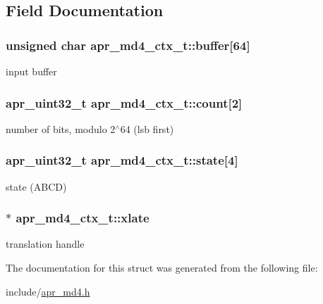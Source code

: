 \subsection{Field Documentation}
\hypertarget{structapr__md4__ctx__t_a60ce2de9e1c0b8888d81da03afdbfcdb}{
\subsubsection[{buffer}]{\setlength{\rightskip}{0pt plus 5cm}unsigned char apr\-\_\-md4\-\_\-ctx\-\_\-t\-::buffer\mbox{[}64\mbox{]}}}\label{structapr__md4__ctx__t_a60ce2de9e1c0b8888d81da03afdbfcdb}
input buffer \hypertarget{structapr__md4__ctx__t_a0332072316c6a931b6fb1bd8729e3495}{
\subsubsection[{count}]{\setlength{\rightskip}{0pt plus 5cm}apr\-\_\-uint32\-\_\-t apr\-\_\-md4\-\_\-ctx\-\_\-t\-::count\mbox{[}2\mbox{]}}}\label{structapr__md4__ctx__t_a0332072316c6a931b6fb1bd8729e3495}
number of bits, modulo 2$^\wedge$64 (lsb first) \hypertarget{structapr__md4__ctx__t_a7fc20af590cdf6d01208a12ac0bbc5de}{
\subsubsection[{state}]{\setlength{\rightskip}{0pt plus 5cm}apr\-\_\-uint32\-\_\-t apr\-\_\-md4\-\_\-ctx\-\_\-t\-::state\mbox{[}4\mbox{]}}}\label{structapr__md4__ctx__t_a7fc20af590cdf6d01208a12ac0bbc5de}
state (A\-B\-C\-D) \hypertarget{structapr__md4__ctx__t_ae4dd6785ef4bf0e04b37d566af786554}{
\subsubsection[{xlate}]{$\ast$ apr\-\_\-md4\-\_\-ctx\-\_\-t\-::xlate}}\label{structapr__md4__ctx__t_ae4dd6785ef4bf0e04b37d566af786554}
translation handle 

The documentation for this struct was generated from the following file\-:\begin{DoxyCompactItemize}
\item 
include/\hyperlink{apr__md4_8h}{apr\-\_\-md4.\-h}\end{DoxyCompactItemize}

